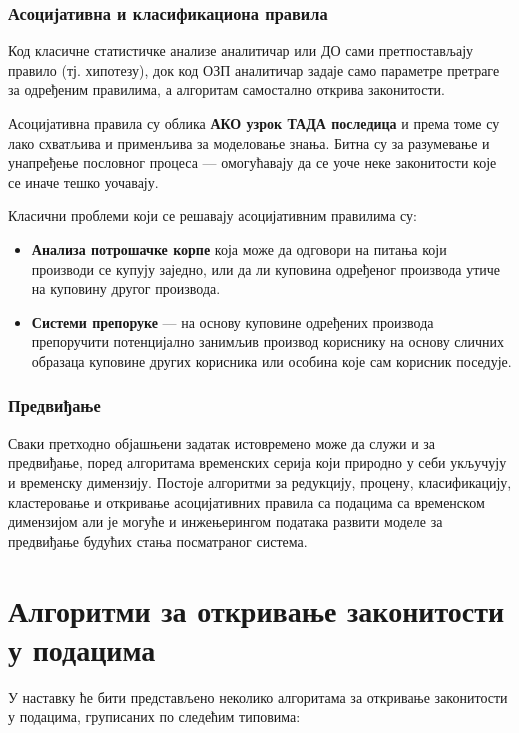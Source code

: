 \subsubsection{Асоцијативна и класификациона правила}
Код класичне статистичке анализе аналитичар или ДО сами претпостављају правило (тј. хипотезу), док код ОЗП аналитичар задаје само параметре претраге за одређеним правилима, а алгоритам самостално открива законитости.

Асоцијативна правила су облика \textbf{АКО узрок ТАДА последица} и према томе су лако схватљива и применљива за моделовање знања. Битна су за разумевање и унапређење пословног процеса — омогућавају да се уоче неке законитости које се иначе тешко уочавају.

Класични проблеми који се решавају асоцијативним правилима су:

\begin{itemize}
  \item \textbf{Анализа потрошачке корпе} која може да одговори на питања који производи се купују заједно, или да ли куповина одређеног производа утиче на куповину другог производа.
  \item \textbf{Системи препоруке} — на основу куповине одређених производа препоручити потенцијално занимљив производ кориснику на основу сличних образаца куповине других корисника или особина које сам корисник поседује.
\end{itemize}

\subsubsection{Предвиђање}
Сваки претходно објашњени задатак истовремено може да служи и за предвиђање, поред алгоритама временских серија који природно у себи укључују и временску димензију. Постоје алгоритми за редукцију, процену, класификацију, кластеровање и откривање асоцијативних правила са подацима са временском димензијом али је могуће и инжењерингом података развити моделе за предвиђање будућих стања посматраног система.

\section{Алгоритми за откривање законитости у подацима}
У наставку ће бити представљено неколико алгоритама за откривање законитости у подацима, груписаних по следећим типовима:

